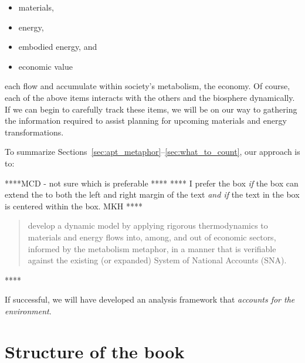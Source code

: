 \begin{itemize}
	\item{materials,}
	\item{energy,}
	\item{embodied energy, and}
	\item{economic value}
\end{itemize}

\noindent{}each flow and accumulate within society's metabolism, the economy.
Of course, each of the above items interacts with the others 
and the biosphere dynamically.
If we can begin to carefully track these items, 
we will be on our way to gathering the information required to 
assist planning for upcoming materials and energy transformations.

To summarize Sections~\ref{sec:apt_metaphor}--\ref{sec:what_to_count}, 
our approach is to:

****MCD - not sure which is preferable **** 
**** I prefer the box \emph{if} the box can extend the to both the left and right margin
of the text \emph{and if} the text in the box is centered within the box. MKH ****
 
\begin{quote}
\begin{normalsize}
develop a dynamic model 
by applying rigorous thermodynamics 
to materials and energy flows into, among, and out of economic sectors,
informed by the metabolism metaphor,
in a manner that is verifiable against 
the existing (or expanded) System of National Accounts (SNA).
\end{normalsize}
\end{quote}

\noindent{}

****

\noindent{}If successful, we will have developed an analysis framework 
that \emph{accounts for the environment}.


\section{Structure of the book}
\label{sec:structure}

